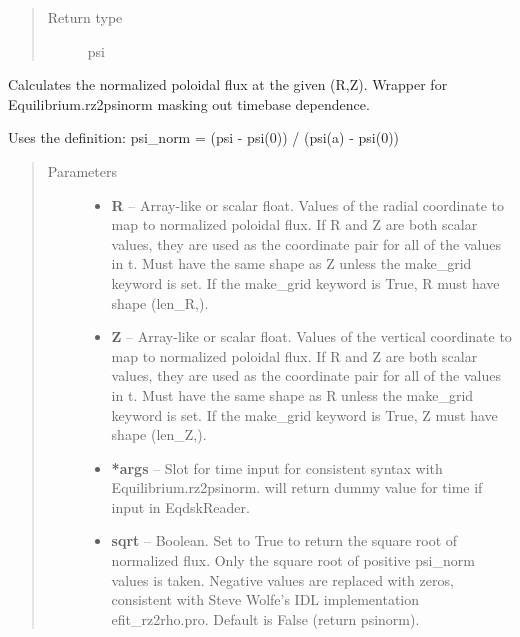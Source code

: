 \documentclass[letterpaper,10pt,english]{sphinxmanual}
\begin{document}
\begin{fulllineitems}
\begin{fulllineitems}
\begin{quote}
\begin{description}
\begin{description}
\end{description}


\item[{Return type}] \leavevmode
psi

\end{description}\end{quote}

\end{fulllineitems}


\begin{fulllineitems}
\label{eqtools:eqtools.eqdskreader.EqdskReader.rz2psinorm}
Calculates the normalized poloidal flux at the given (R,Z).
Wrapper for Equilibrium.rz2psinorm masking out timebase dependence.

Uses the definition:
psi\_norm = (psi - psi(0)) / (psi(a) - psi(0))
\begin{quote}\begin{description}
\item[{Parameters}] \leavevmode\begin{itemize}
\item {} 
\textbf{R} -- Array-like or scalar float.
Values of the radial coordinate to
map to normalized poloidal flux. If R and Z are both scalar
values, they are used as the coordinate pair for all of the
values in t. Must have the same shape as Z unless the make\_grid
keyword is set. If the make\_grid keyword is True, R must have
shape (len\_R,).

\item {} 
\textbf{Z} -- Array-like or scalar float.
Values of the vertical coordinate to
map to normalized poloidal flux. If R and Z are both scalar
values, they are used as the coordinate pair for all of the
values in t. Must have the same shape as R unless the make\_grid
keyword is set. If the make\_grid keyword is True, Z must have
shape (len\_Z,).

\item {} 
\textbf{*args} -- Slot for time input for consistent syntax with Equilibrium.rz2psinorm.
will return dummy value for time if input in EqdskReader.

\item {} 
\textbf{sqrt} -- Boolean.
Set to True to return the square root of normalized
flux. Only the square root of positive psi\_norm values is taken.
Negative values are replaced with zeros, consistent with Steve
Wolfe's IDL implementation efit\_rz2rho.pro. Default is False
(return psinorm).


\end{itemize}
\end{description}
\end{quote}
\end{fulllineitems}
\end{fulllineitems}
\end{document}
